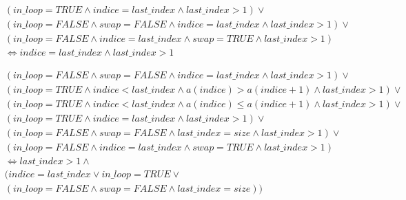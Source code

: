 \begin{align*}
&(in\_loop=TRUE \land indice=last\_index \land last\_index>1) \lor \\
&(in\_loop=FALSE \land swap=FALSE \land indice=last\_index \land last\_index>1) \lor \\
&(in\_loop=FALSE \land indice=last\_index \land swap=TRUE \land last\_index>1) \\
&\Leftrightarrow indice=last\_index \land last\_index>1
\end{align*}

\begin{align*}
&(in\_loop=FALSE \land swap=FALSE \land indice=last\_index \land last\_index>1) \lor \\
&(in\_loop=TRUE \land indice<last\_index \land a(indice)>a(indice+1) \land last\_index>1) \lor \\
&(in\_loop=TRUE \land indice<last\_index \land a(indice) \leq a(indice+1) \land last\_index>1) \lor \\
&(in\_loop=TRUE \land indice=last\_index \land last\_index>1) \lor \\
&(in\_loop=FALSE \land swap=FALSE \land last\_index=size \land last\_index>1) \lor \\
&(in\_loop=FALSE \land indice=last\_index \land swap=TRUE \land last\_index>1) \\
&\Leftrightarrow last\_index>1 \land \\
&(indice=last\_index \lor in\_loop=TRUE \lor \\
&(in\_loop=FALSE \land swap=FALSE \land last\_index=size))
\end{align*}








